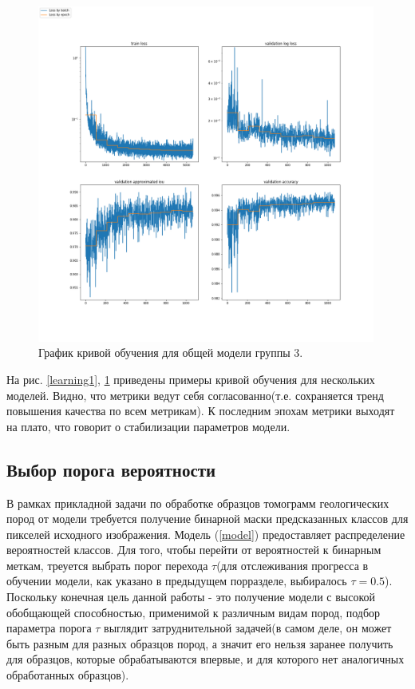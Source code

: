 \documentclass[12pt, a4paper]{extarticle}
\begin{document}
\begin{figure}[h!]
\includegraphics[width=0.99\textwidth]{data/images/learning_progress_SoilB-2_Urna_22_carb96558.png}
\caption{График кривой обучения для общей модели группы 3.}
\label{learning2}
\end{figure}

На рис. \ref{learning1}, \ref{learning2} приведены примеры кривой обучения для нескольких моделей. Видно, что метрики ведут себя согласованно(т.е. сохраняется тренд повышения качества по всем метрикам). К последним эпохам метрики выходят на плато, что говорит о стабилизации параметров модели.

\subsection{Выбор порога вероятности} 

В рамках прикладной задачи по обработке образцов томограмм геологических пород от модели требуется получение бинарной маски предсказанных классов для пикселей исходного изображения. Модель 
(\ref{model}) предоставляет распределение вероятностей классов. Для того, чтобы перейти от вероятностей к бинарным меткам, треуется выбрать порог перехода $\tau$(для отслеживания прогресса в обучении модели, как указано в предыдущем порразделе, выбиралось $\tau=0.5$).
Поскольку конечная цель данной работы - это получение модели с высокой обобщающей способностью, применимой к различным видам пород, подбор параметра порога $\tau$ выглядит затруднительной задачей(в самом деле, он может быть разным для разных образцов пород, а значит его нельзя заранее получить для образцов, которые обрабатываются впервые, и для которого нет аналогичных обработанных образцов).
\end{document}
